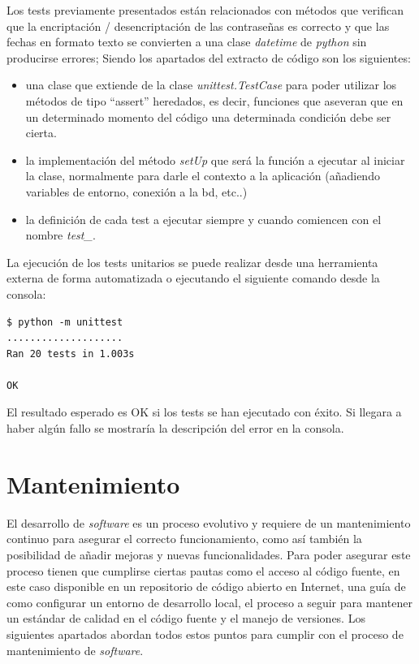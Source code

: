 \documentclass[11pt,spanish,listoffigures,listoftables]{tfgetsinf}
\begin{document}
Los tests previamente presentados están relacionados con métodos que verifican que la encriptación / desencriptación de las contraseñas es correcto y que las fechas en formato texto se convierten a una clase \textit{datetime} de \textit{python} sin producirse errores; Siendo los apartados del extracto de código son los siguientes:

\begin{itemize}
	\item una clase que extiende de la clase \textit{unittest.TestCase} para poder utilizar los métodos de tipo ``assert'' heredados, es decir, funciones que aseveran que en un determinado momento del código una determinada condición debe ser cierta.
	\item la implementación del método \textit{setUp} que será la función a ejecutar al iniciar la clase, normalmente para darle el contexto a la aplicación (añadiendo variables de entorno, conexión a la \acrshort{bd}, etc..)
	\item la definición de cada test a ejecutar siempre y cuando comiencen con el nombre \textit{test\_}.
\end{itemize}

La ejecución de los tests unitarios se puede realizar desde una herramienta externa de forma automatizada o ejecutando el siguiente comando desde la consola:

\begin{lstlisting}[style=ascii-tree]
$ python -m unittest
....................
Ran 20 tests in 1.003s

OK
\end{lstlisting}

El resultado esperado es OK si los tests se han ejecutado con éxito. Si llegara a haber algún fallo se mostraría la descripción del error en la consola. 

\chapter{Mantenimiento}

El desarrollo de \textit{software} es un proceso evolutivo y requiere de un mantenimiento continuo para asegurar el correcto funcionamiento, como así también la posibilidad de añadir mejoras y nuevas funcionalidades. Para poder asegurar este proceso tienen que cumplirse ciertas pautas como el acceso al código fuente, en este caso disponible en un repositorio de código abierto en Internet, una guía de como configurar un entorno de desarrollo local, el proceso a seguir para mantener un estándar de calidad en el código fuente y el manejo de versiones. Los siguientes apartados abordan todos estos puntos para cumplir con el proceso de mantenimiento de \textit{software}.
\end{document}
